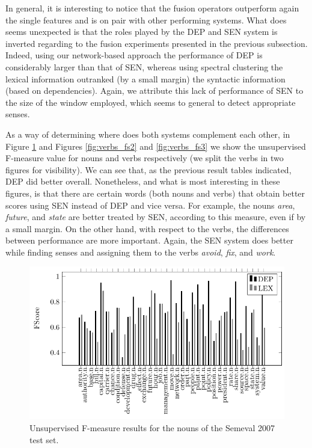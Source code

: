 In general, it is interesting to notice that the fusion operators outperform again the single features and is on pair with other performing systems. What does seems unexpected is that the roles played by the DEP and SEN system is inverted regarding to the fusion experiments presented in the previous subsection. Indeed, using our network-based approach the performance of DEP is considerably larger than that of SEN, whereas using spectral clustering the lexical information outranked (by a small margin) the syntactic information (based on dependencies). Again, we attribute this lack of performance of SEN to the size of the window employed, which seems to general to detect appropriate senses.


As a way of determining where does both systems complement each other, in Figure \ref{fig:nouns_fs} and Figures  \ref{fig:verbs_fs2} and \ref{fig:verbs_fs3} we show the unsupervised F-measure value for nouns and verbs respectively (we split the verbs in two figures for visibility). We can see that, as the previous result tables indicated, DEP did better overall. Nonetheless, and what is most interesting in these figures, is that there are certain words (both nouns and verbs) that obtain better scores using SEN instead of DEP and vice versa. For example, the nouns \textit{area}, \textit{future}, and \textit{state} are better treated by SEN, according to this measure, even if by a small margin. On the other hand, with respect to the verbs, the differences between performance are more important. Again, the SEN system does better while finding senses and assigning them to the verbs \textit{avoid}, \textit{fix}, and \textit{work}. %

 




 \begin{figure}[!htb]
\centering
\includegraphics[width=1\linewidth]{images/Chapitre5/tex_img_files/nouns_fs.pdf}
\caption{Unsupervised F-measure results for the nouns of the Semeval 2007 test set.}
\label{fig:nouns_fs}
\end{figure}

